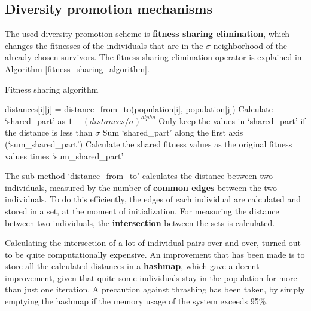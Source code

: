 \documentclass[a4paper,10pt]{article}
\newcommand{\ReplaceMe}[1]{{\color{blue}#1}}
\begin{document}
\subsection{Diversity promotion mechanisms}
\label{diversity_promotion}
The used diversity promotion scheme is \textbf{fitness sharing elimination}, which changes the fitnesses of the individuals that are in the $\sigma$-neighborhood of the already chosen survivors. The fitness sharing elimination operator is explained in Algorithm \ref{fitness_sharing_algorithm}.

\begin{algorithm}
\begin{algorithmic}
\caption{Fitness sharing algorithm}
\label{fitness_sharing_algorithm}
\State distances[i][j] = distance\_from\_to(population[i], population[j])
\EndFor
\EndFor
\State Calculate `shared\_part' as $1 - (distances / \sigma)^{alpha}$
\State Only keep the values in `shared\_part' if the distance is less than $\sigma$
\State Sum `shared\_part' along the first axis (`sum\_shared\_part')
\State Calculate the shared fitness values as the original fitness values times `sum\_shared\_part'
\end{algorithmic}
\end{algorithm}

The sub-method `distance\_from\_to' calculates the distance between two individuals, measured by the number of \textbf{common edges} between the two individuals. To do this efficiently, the edges of each individual are calculated and stored in a set, at the moment of initialization. For measuring the distance between two individuals, the \textbf{intersection} between the sets is calculated.

Calculating the intersection of a lot of individual pairs over and over, turned out to be quite computationally expensive. An improvement that has been made is to store all the calculated distances in a \textbf{hashmap}, which gave a decent improvement, given that quite some individuals stay in the population for more than just one iteration. A precaution against thrashing has been taken, by simply emptying the hashmap if the memory usage of the system exceeds 95\%.
\end{document}
